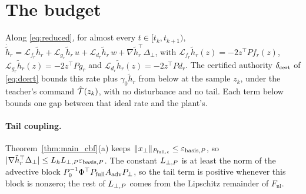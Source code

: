 \section{The budget}
\label{sec:budget}

Along \eqref{eq:reduced}, for almost every $t \in [t_k, t_{k+1})$, $\dot{\tilde h}_r = \mathcal{L}_{f_r}\tilde h_r + \mathcal{L}_{g_r}\tilde h_r\,u + \mathcal{L}_{d_r}\tilde h_r\,w + \nabla\tilde h_r^\top\Delta_\perp$, with $\mathcal{L}_{f_r}\tilde h_r(z) = -2z^\top Pf_r(z)$, $\mathcal{L}_{g_r}\tilde h_r(z) = -2z^\top Pg_r$ and $\mathcal{L}_{d_r}\tilde h_r(z) = -2z^\top Pd_r$. The certified authority $\delta_{\mathrm{cert}}$ of \eqref{eq:dcert} bounds this rate plus $\gamma_0\tilde h_r$ from below at the sample $z_k$, under the teacher's command $\hat{\mathcal{T}}(z_k)$, with no disturbance and no tail. Each term below bounds one gap between that ideal rate and the plant's.

\paragraph{Tail coupling.}
Theorem~\ref{thm:main_cbf}(a) keeps $\|x_\perp\|_{P_{\mathrm{full},\epsilon}} \le \varepsilon_{\mathrm{basis},P}$, so $|\nabla\tilde h_r^\top\Delta_\perp| \le L_hL_{\perp,P}\varepsilon_{\mathrm{basis},P}$. The constant $L_{\perp,P}$ is at least the norm of the advective block $P_0^{-1}\Phi^\top P_{\mathrm{full}} A_{\mathrm{adv}}P_\perp$, so the tail term is positive whenever this block is nonzero; the rest of $L_{\perp,P}$ comes from the Lipschitz remainder of $F_{\mathrm{nl}}$.

